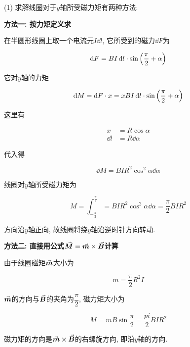 \begin{example}
	\begin{solution}
		
		(1) 求解线圈对于$y$轴所受磁力矩有两种方法: 
		
		\textbf{方法一: 按力矩定义求}
		
		在半圆形线圈上取一个电流元$I\dd{l}$, 它所受到的磁力$\dd{F}$为
		
		\begin{equation*}
			\dd{F} = BI\dd{l} \cdot \sin\qty(\dfrac{\pi}{2} + \alpha) 
		\end{equation*}
		
		它对$y$轴的力矩
		
		\begin{equation*}
			\dd{M} = \dd{F} \cdot x = xBI\dd{l} \cdot \sin \qty(\dfrac{\pi}{2} + \alpha) 
		\end{equation*}
		
		这里有
		
		\begin{align*}
			x &= R \cos \alpha \\
			\dd{l} &= R \dd{\alpha}
		\end{align*}
		
		代入得
		
		\begin{equation*}
			\dd{M} = BIR^2 \cos^2 \alpha \dd{\alpha}
		\end{equation*}
		
		线圈对$y$轴所受磁力矩为
		
		\begin{equation*}
			M = \int_{-\frac{\pi}{2}}^{\frac{\pi}{2}} = BIR^2 \cos^2 \alpha \dd{\alpha} = \dfrac{\pi}{2} BIR^2
		\end{equation*}
		
		方向沿$y$轴正向, 故线圈将绕$y$轴沿逆时针方向转动. 
		
		\textbf{方法二: 直接用公式$\va*{M} = \va*{m} \times \va*{B}$计算}
		
		由于线圈磁矩$\va*{m}$大小为
		
		\begin{equation*}
			m = \dfrac{\pi}{2} R^2 I
		\end{equation*}
		
		$\va*{m}$的方向与$\va*{B}$的夹角为$\dfrac{\pi}{2}$, 磁力矩大小为
		
		\begin{equation*}
			M = m B \sin\dfrac{\pi}{2} = \dfrac{pi}{2} BIR^2
		\end{equation*}
		
		磁力矩的方向是$\va*{m} \times \va*{B}$的右螺旋方向, 即沿$y$轴的方向.
		

\end{solution}
\end{example}
